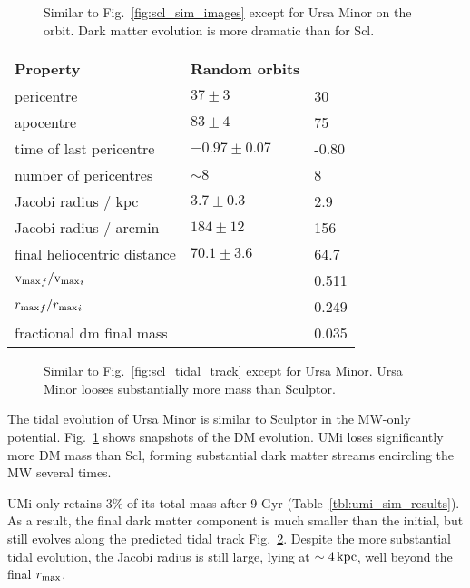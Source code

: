 \begin{figure}
\centering
{}
\caption[Ursa Minor simulation snapshots]{Similar to
Fig.~\ref{fig:scl_sim_images} except for Ursa Minor on the \smallperi{}
orbit. Dark matter evolution is more dramatic than for
Scl.}\label{fig:umi_sim_images}
\end{figure}

\begin{table*}[t]
\centering
\caption[Simulation results for Ursa Minor’s dark matter]{The present-day properties for Ursa Minor’s final dark matter halo. See Table \ref{tbl:scl_sim_results} for details. }
\label{tbl:umi_sim_results}
\begin{tabular}{lll}
\toprule
Property & Random orbits & \smallperi{}\\
\midrule
pericentre & $37\pm3$ & 30\\
apocentre & $83 \pm 4$ & 75\\
time of last pericentre & $-0.97 \pm 0.07$ & -0.80\\
number of pericentres & $\sim 8$ & 8\\
Jacobi radius / kpc & $3.7 \pm 0.3$ & 2.9\\
Jacobi radius / arcmin & $184 \pm 12$ & 156\\
final heliocentric distance & $70.1 \pm 3.6$ & 64.7\\
${{\rm v}_{\rm max}}_f / {{\rm v}_{\rm max}}_i$ &  & 0.511\\
${r_{\rm max}}_f / {r_{\rm max}}_i$ &  & 0.249\\
fractional dm final mass &  & 0.035\\
\bottomrule
\end{tabular}
\end{table*}

\begin{figure}
\centering
{}
\caption[Ursa Minor tidal tracks]{Similar to
Fig.~\ref{fig:scl_tidal_track} except for Ursa Minor. Ursa Minor looses
substantially more mass than Sculptor.}\label{fig:umi_tidal_track}
\end{figure}

The tidal evolution of Ursa Minor is similar to Sculptor in the MW-only
potential. Fig.~\ref{fig:umi_sim_images} shows snapshots of the DM
evolution. UMi loses significantly more DM mass than Scl, forming
substantial dark matter streams encircling the MW several times.

UMi only retains 3\% of its total mass after 9 Gyr
(Table~\ref{tbl:umi_sim_results}). As a result, the final dark matter
component is much smaller than the initial, but still evolves along the
predicted tidal track Fig.~\ref{fig:umi_tidal_track}. Despite the more
substantial tidal evolution, the Jacobi radius is still large, lying at
\(\sim 4\,{\rm kpc}\), well beyond the final \(r_{\rm max}\).


